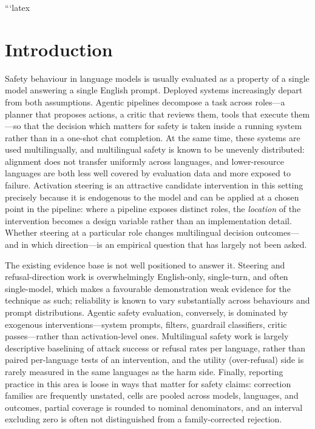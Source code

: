 ```latex
\section{Introduction}

Safety behaviour in language models is usually evaluated as a property of a
single model answering a single English prompt. Deployed systems increasingly
depart from both assumptions. Agentic pipelines decompose a task across roles---a
planner that proposes actions, a critic that reviews them, tools that execute
them---so that the decision which matters for safety is taken inside a running
system rather than in a one-shot chat completion. At the same time, these systems
are used multilingually, and multilingual safety is known to be unevenly
distributed: alignment does not transfer uniformly across languages, and
lower-resource languages are both less well covered by evaluation data and more
exposed to failure. Activation steering is an attractive candidate intervention
in this setting precisely because it is endogenous to the model and can be
applied at a chosen point in the pipeline: where a pipeline exposes distinct
roles, the \emph{location} of the intervention becomes a design variable rather
than an implementation detail. Whether steering at a particular role changes
multilingual decision outcomes---and in which direction---is an empirical
question that has largely not been asked.

The existing evidence base is not well positioned to answer it. Steering and
refusal-direction work is overwhelmingly English-only, single-turn, and often
single-model, which makes a favourable demonstration weak evidence for the
technique as such; reliability is known to vary substantially across behaviours
and prompt distributions. Agentic safety evaluation, conversely, is dominated by
exogenous interventions---system prompts, filters, guardrail classifiers, critic
passes---rather than activation-level ones. Multilingual safety work is largely
descriptive baselining of attack success or refusal rates per language, rather
than paired per-language tests of an intervention, and the utility (over-refusal)
side is rarely measured in the same languages as the harm side. Finally,
reporting practice in this area is loose in ways that matter for safety claims:
correction families are frequently unstated, cells are pooled across models,
languages, and outcomes, partial coverage is rounded to nominal denominators, and
an interval excluding zero is often not distinguished from a family-corrected
rejection.


